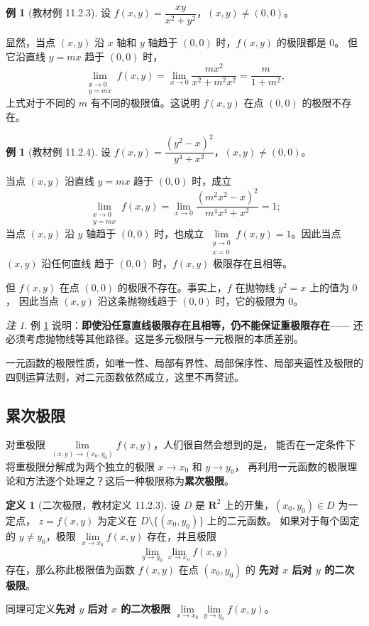 \documentclass[11pt]{ctexart}
\theoremstyle{plain}
\theoremstyle{definition}
\newtheorem{defn}[thm]{定义}
\newtheorem{ex}[thm]{例}
\theoremstyle{remark}
\newtheorem*{rem}{注}
\begin{document}
\begin{ex}[教材例 11.2.3]\label{ex:lim2}
设 \(f(x,y)=\dfrac{xy}{x^2+y^2}\)，\((x,y)\neq(0,0)\)。

显然，当点 \((x,y)\) 沿 \(x\) 轴和 \(y\) 轴趋于 \((0,0)\) 时，\(f(x,y)\) 的极限都是 \(0\)。
但它沿直线 \(y=mx\) 趋于 \((0,0)\) 时，
\[
  \lim_{\substack{x\to 0\\ y=mx}}f(x,y)=\lim_{x\to 0}\frac{mx^2}{x^2+m^2x^2}
  =\frac{m}{1+m^2},
\]
上式对于不同的 \(m\) 有不同的极限值。这说明 \(f(x,y)\) 在点 \((0,0)\) 的极限不存在。
\end{ex}

\begin{ex}[教材例 11.2.4]\label{ex:lim3}
设 \(f(x,y)=\dfrac{(y^2-x)^2}{y^4+x^2}\)，\((x,y)\neq(0,0)\)。

当点 \((x,y)\) 沿直线 \(y=mx\) 趋于 \((0,0)\) 时，成立
\[
  \lim_{\substack{x\to 0\\ y=mx}}f(x,y)
  =\lim_{x\to 0}\frac{(m^2x^2-x)^2}{m^4x^4+x^2}=1;
\]
当点 \((x,y)\) 沿 \(y\) 轴趋于 \((0,0)\) 时，也成立
\(\lim\limits_{\substack{y\to 0\\ x=0}}f(x,y)=1\)。因此当点 \((x,y)\) 沿任何直线
趋于 \((0,0)\) 时，\(f(x,y)\) 极限存在且相等。

但 \(f(x,y)\) 在点 \((0,0)\) 的极限不存在。事实上，\(f\) 在抛物线 \(y^2=x\) 上的值为 \(0\)，
因此当点 \((x,y)\) 沿这条抛物线趋于 \((0,0)\) 时，它的极限为 \(0\)。
\end{ex}

\begin{rem}
例 \ref{ex:lim3} 说明：\textbf{即使沿任意直线极限存在且相等，仍不能保证重极限存在}——
还必须考虑抛物线等其他路径。这是多元极限与一元极限的本质差别。
\end{rem}

一元函数的极限性质，如唯一性、局部有界性、局部保序性、局部夹逼性及极限的
四则运算法则，对二元函数依然成立，这里不再赘述。

\subsection{累次极限}

对重极限 \(\lim\limits_{(x,y)\to(x_0,y_0)}f(x,y)\)，人们很自然会想到的是，
能否在一定条件下将重极限分解成为两个独立的极限 \(x\to x_0\) 和 \(y\to y_0\)，
再利用一元函数的极限理论和方法逐个处理之？这后一种极限称为\textbf{累次极限}。

\begin{defn}[二次极限，教材定义 11.2.3]\label{def:iterated}
设 \(D\) 是 \(\mathbf{R}^2\) 上的开集，\((x_0,y_0)\in D\) 为一定点，
\(z=f(x,y)\) 为定义在 \(D\setminus\{(x_0,y_0)\}\) 上的二元函数。
如果对于每个固定的 \(y\neq y_0\)，极限
\(\lim\limits_{x\to x_0}f(x,y)\) 存在，并且极限
\[
  \lim_{y\to y_0}\lim_{x\to x_0}f(x,y)
\]
存在，那么称此极限值为函数 \(f(x,y)\) 在点 \((x_0,y_0)\) 的
\textbf{先对 \(x\) 后对 \(y\) 的二次极限}。

同理可定义\textbf{先对 \(y\) 后对 \(x\) 的二次极限}
\(\lim\limits_{x\to x_0}\lim\limits_{y\to y_0}f(x,y)\)。
\end{defn}
\end{document}
